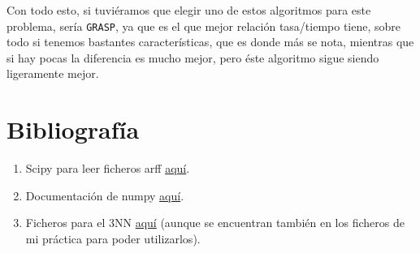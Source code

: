 \documentclass[12pt]{article}
\begin{document}
Con todo esto, si tuviéramos que elegir uno de estos algoritmos para este problema, sería \texttt{GRASP}, ya que es el que mejor relación tasa/tiempo tiene, sobre todo si tenemos bastantes características, que es donde más se nota, mientras que si hay pocas la diferencia es mucho mejor, pero éste algoritmo sigue siendo ligeramente mejor.

\section{Bibliografía}
\begin{enumerate}
\item Scipy para leer ficheros arff \href{arff http://docs.scipy.org/doc/scipy/reference/generated/scipy.io.arff.loadarff.html}{aquí}.
\item Documentación de numpy \href{http://docs.scipy.org/doc/numpy/user/index.html}{aquí}.
\item Ficheros para el 3NN \href{https://github.com/agarciamontoro/metaheuristics/tree/master/src/knnGPU}{aquí} (aunque se encuentran también en los ficheros de mi práctica para poder utilizarlos).
\end{enumerate}
\end{document}
